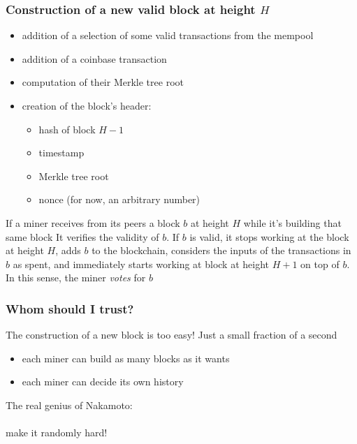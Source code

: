 \documentclass[11pt]{beamer}  %
\begin{document}
\begin{frame}\frametitle{Construction of a new valid block at height $H$}

    \begin{greenbox}{}
      \begin{itemize}
      \item addition of a selection of some valid transactions from the mempool
      \item addition of a coinbase transaction
      \item computation of their Merkle tree root
      \item creation of the block's header:
        \begin{itemize}
        \item hash of block $H-1$
        \item timestamp
        \item Merkle tree root
        \item nonce (for now, an arbitrary number)
        \end{itemize}
      \end{itemize}
    \end{greenbox}

    \bigskip

    \begin{greenbox}{If a miner receives from its peers a block $b$ at height $H$
        while it's building that same block}
      It verifies the validity of $b$. If $b$ is valid,
      it stops working at the block at height $H$, adds $b$ to the blockchain,
      considers the inputs of the transactions in $b$ as spent,
      and immediately starts working at block at height $H+1$ on top of $b$. In this sense,
      the miner \emph{votes} for $b$
    \end{greenbox}

\end{frame}

\begin{frame}\frametitle{Whom should I trust?}

  \begin{redbox}{The construction of a new block is too easy!}
    Just a small fraction of a second

    \begin{itemize}
    \item[$\Rightarrow$] each miner can build as many blocks as it wants
    \item[$\Rightarrow$] each miner can decide its own history
    \end{itemize}
  \end{redbox}

  \bigskip
  \bigskip

  \pause

  \begin{center}
    The real genius of Nakamoto:\\

    \mbox{}\\
    
    {\Huge make it randomly hard!}
  \end{center}

\end{frame}
\end{document}
